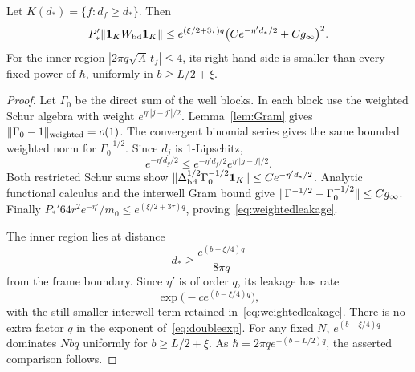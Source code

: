 \begin{lemma}\label{lem:leakage}
Let $K(d_*)=\{f:d_f\ge d_*\}$. Then
\begin{equation}\label{eq:weightedleakage}
 P_*'\lVert \mathbf 1_KW_{\rm bd}\mathbf 1_K\rVert
 \le e^{(\xi/2+3\tau)q}
       \bigl(Ce^{-\eta'd_*/2}+Cg_\infty\bigr)^2.
\end{equation}
For the inner region $|2\pi q\sqrt\Lambda\,t_f|\le4$, its right-hand side is smaller than every fixed power of $\hbar$, uniformly in $b\ge L/2+\xi$.
\end{lemma}
\begin{proof}
Let $\Gamma_0$ be the direct sum of the well blocks. In each block use the weighted Schur algebra with weight $e^{\eta'|j-j'|/2}$. Lemma~\ref{lem:Gram} gives $\lVert \Gamma_0-1\rVert_{\rm weighted}=o(1)$. The convergent binomial series gives the same bounded weighted norm for $\Gamma_0^{-1/2}$. Since $d_j$ is 1-Lipschitz,
\[
 e^{-\eta'd_g/2}\le e^{-\eta'd_f/2}e^{\eta'|g-f|/2}.
\]
Both restricted Schur sums show
$\lVert \Delta_{\rm bd}^{1/2}\Gamma_0^{-1/2}\mathbf 1_K\rVert
\le Ce^{-\eta'd_*/2}$. Analytic functional calculus and the interwell Gram bound give
$\lVert \Gamma^{-1/2}-\Gamma_0^{-1/2}\rVert\le Cg_\infty$.
Finally $P_*'64r^2e^{-\eta'}/m_0\le e^{(\xi/2+3\tau)q}$, proving~\eqref{eq:weightedleakage}.

The inner region lies at distance
\[
 d_*\ge\frac{e^{(b-\xi/4)q}}{8\pi q}
\]
from the frame boundary. Since $\eta'$ is of order $q$, its leakage has rate
\begin{equation}\label{eq:doubleexp}
 \exp\bigl(-c e^{(b-\xi/4)q}\bigr),
\end{equation}
with the still smaller interwell term retained in~\eqref{eq:weightedleakage}. There is no extra factor $q$ in the exponent of~\eqref{eq:doubleexp}. For any fixed $N$, $e^{(b-\xi/4)q}$ dominates $Nbq$ uniformly for $b\ge L/2+\xi$. As $\hbar=2\pi qe^{-(b-L/2)q}$, the asserted comparison follows.
\end{proof}

